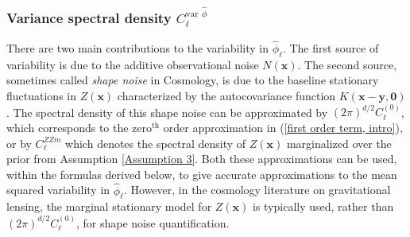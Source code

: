 \documentclass[10pt,noinfoline]{imsart}
\newcommand{\bs}{\boldsymbol}
\begin{document}
\subsubsection{Variance spectral density $C_{\bs \ell}^{\text{var }\hat\phi}$}
\label{SubSection: var}


There are two main contributions to the variability in $\hat\phi_{\bs\ell}$. The first source of variability is due to the   additive observational noise $N(\bs x)$. The second source, sometimes called \textit{shape noise} in Cosmology, is due to the baseline stationary fluctuations in $Z(\bs x)$ characterized by the autocovariance function $K(\bs x - \bs y, \bs 0)$.  The spectral density of this shape noise can be approximated by ${(2\pi)}^{d/2}C^{(0)}_{\bs \ell}$, which corresponds to the zero${}^\text{th}$ order approximation in (\ref{first order term, intro}), or by $C^{ZZm}_{\bs \ell}$ which denotes the  spectral density of $Z(\bs x)$ marginalized over the prior from Assumption \ref{Assumption 3}. Both these approximations can be used, within the formulas derived below, to give accurate approximations to the mean squared variability in $\hat\phi_{\bs \ell}$. However, in the cosmology literature on gravitational lensing, the marginal stationary model for $Z(\bs x)$ is typically used, rather than ${(2\pi)}^{d/2}C^{(0)}_{\bs \ell}$, for shape noise quantification.
\end{document}
